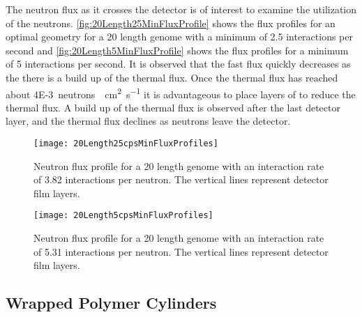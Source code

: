 The neutron flux as it crosses the detector is of interest to examine the utilization of the neutrons.
\autoref{fig:20Length25MinFluxProfile} shows the flux profiles for an optimal geometry for a 20 length genome with a minimum of 2.5 interactions per second and \autoref{fig:20Length5MinFluxProfile} shows the flux profiles for a minimum of 5 interactions per second.
It is observed that the fast flux quickly decreases as the there is a build up of the thermal flux.
Once the thermal flux has reached about \SI{4E-3}{neutrons \per \cm\squared \per\second} it is advantageous to place layers of  to reduce the thermal flux.
A build up of the thermal flux is observed after the last detector layer, and the thermal flux declines as neutrons leave the detector.
\begin{figure}
	\centering
	\texttt{[image: 20Length25cpsMinFluxProfiles]}
	\caption[Neutron Flux Profile for an Optimal 20 Length Genome, minimum 2.5 interactions per second]{Neutron flux profile for a 20 length genome with an interaction rate of 3.82 interactions per neutron. The vertical lines represent detector film layers.}
	\label{fig:20Length25MinFluxProfile}
\end{figure}
\begin{figure}
	\centering
	\texttt{[image: 20Length5cpsMinFluxProfiles]}
	\caption[Neutron Flux Profile for an Optimal 20 Length Genome, minimum 5 interactions per second]{Neutron flux profile for a 20 length genome with an interaction rate of 5.31 interactions per neutron. The vertical lines represent detector film layers.}
	\label{fig:20Length5MinFluxProfile}
\end{figure}

\subsection{Wrapped Polymer Cylinders}
\label{sec:WrappedCylinders}

